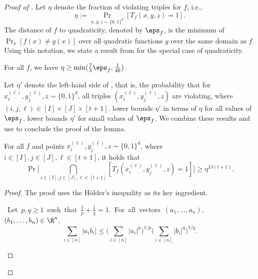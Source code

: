 \documentclass{toc}
\begin{document}
\begin{proof}[Proof of ]
Let $\eta$ denote the fraction of violating triples for $f$, i.e.,
\begin{equation*}
   \eta := \Pr_{x,y,z \sim \{0,1\}^d}[T_f(x,y,z) = 1].
\end{equation*}
The distance of $f$ to quadraticity, denoted by $\eps_f$, is the minimum of $\Pr_x[f(x)\neq g(x)]$ over all quadratic functions $g$ over the same domain as $f$.
Using this notation, we state a result from \cite{AlonKKLR05} for the special case of quadraticity.

\begin{claim}\label{clm:bat}
For all $f$, we have $\eta \geq \min( \frac{7}{3}\eps_f, \frac{1}{40})$.
\end{claim}

 Let $\eta'$ denote the left-hand side of , that is, the probability that for $x_i^{(\ell)}, y_j^{(\ell)}, z \sim \{0,1\}^d$,  all triples $(x_i^{(\ell)}, y_j^{(\ell)}, z)$ are violating, where  $(i,j,\ell) \in [I]\times [J]\times [t+1]$.  lower bounds $\eta'$ in terms of $\eta$ for all values of $\eps_f$.  lower bounds $\eta'$ for small values of $\eps_f$. We  combine these results and use  to conclude the proof of the lemma. 
    
\begin{claim} \label{clm:quadratic_cauchy}
For all $f$  and points $x_i^{(\ell)}, y_j^{(\ell)}, z \sim \{0,1\}^d$, where $i \in [I], j\in[J], \ell\in[t+1]$, it holds that
\begin{equation*}
  \Pr\Big[ \bigcap_{i \in [I], j\in[J], \ell\in[t+1]}[T_f(x_i^{(\ell)}, y_j^{(\ell)}, z) = 1] \Big] \geq  \eta^{IJ(t+1)}.
\end{equation*}
\end{claim}
\begin{proof}
    The proof uses the H\"{o}lder's inequality as its key ingredient. 

  
    \begin{claim}\ Let\ $p, q \geq 1$\ such\ that\
      $\frac 1p+\frac 1q=1$.\ For\ all\ vectors\ $(a_1, \dots, a_n),$
 $(b_1, \dots, b_n) \in \R^{n}$,  %
    \begin{equation*}
        \sum_{i \in [n]}  |a_ib_i| \leq \Big( \sum_{i \in [n]}  |a_i|^{p} \Big)^{1/p} \Big( \sum_{i \in [n]}  |b_i|^{q} \Big)^{1/q}.
    \end{equation*}
    \end{claim}
  

\end{proof}
\end{proof}
\end{document}
